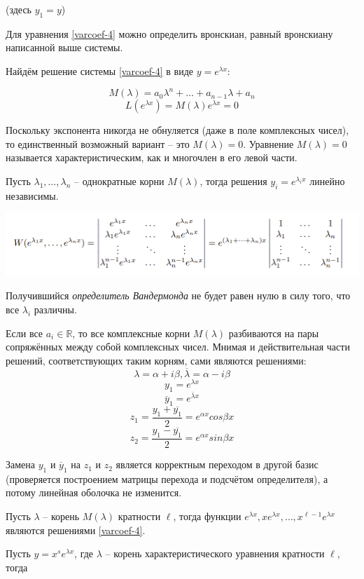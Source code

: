 (здесь $y_1 = y$)

Для уравнения \ref{varcoef-4} можно определить вронскиан, равный вронскиану написанной выше системы.

Найдём решение системы \ref{varcoef-4} в виде $y = e^{\lambda x}$:

$$M(\lambda) = a_0\lambda^n + \ldots + a_{n-1}\lambda + a_n$$
$$L(e^{\lambda x}) = M(\lambda)e^{\lambda x} = 0$$

Поскольку экспонента никогда не обнуляется (даже в поле комплексных чисел), то единственный возможный вариант -- это $M(\lambda) = 0$. Уравнение $M(\lambda) = 0$ называется характеристическим, как и многочлен в его левой части.

\Statement Пусть $\lambda_1, \ldots, \lambda_n$ -- однократные корни $M(\lambda)$, тогда решения $y_i = e^{\lambda_ix}$ линейно независимы.

\Proof
\begin{center}
    \includegraphics[width=0.9\linewidth]{images/vandermond.png}
\end{center}
Получившийся \textit{определитель Вандермонда} не будет равен нулю в силу того, что все $\lambda_i$ различны.


Если все $a_i \in \mathbb{R}$, то все комплексные корни $M(\lambda)$ разбиваются на пары сопряжённых
между собой комплексных чисел. Мнимая и действительная части решений, соответствующих таким корням, сами являются решениями:
$$\lambda = \alpha + i\beta, \overline{\lambda} = \alpha - i\beta$$
$$y_1 = e^{\lambda x}$$
$$\overline{y}_1 = e^{\overline{\lambda} x}$$
$$z_1 = \frac{y_1 + \overline{y_1}}{2} = e^{\alpha x} cos\beta x$$
$$z_2 = \frac{y_1 - \overline{y_1}}{2} = e^{\alpha x} sin\beta x$$

Замена $y_1$ и $\overline{y}_1$ на $z_1$ и $z_2$ является корректным переходом в другой базис (проверяется построением матрицы перехода и подсчётом определителя), а потому линейная оболочка не изменится.
\EndProof

\Statement Пусть $\lambda$ -- корень $M(\lambda)$ кратности $\ell$, тогда функции $e^{\lambda x}, xe^{\lambda x}, \ldots, x^{\ell-1}e^{\lambda x}$
 являются решениями \ref{varcoef-4}.
 
\Lemma Пусть $y = x^se^{\lambda x}$, где $\lambda$ -- корень характеристического уравнения кратности $\ell$,
тогда

